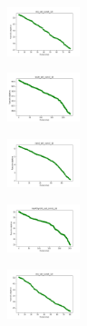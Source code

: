 \begin{figure}[H]
    \centering
    \begin{subfigure}
        \centering
        \includegraphics[width=0.234\textwidth]{img/bl/iris_set_const_10_949004259_cost.png}
    \end{subfigure}
    \hfill
    \begin{subfigure}
        \centering
        \includegraphics[width=0.234\textwidth]{img/bl/ecoli_set_const_10_949004259_cost.png}
    \end{subfigure}
    \hfill
    \begin{subfigure}
        \centering
        \includegraphics[width=0.234\textwidth]{img/bl/rand_set_const_10_949004259_cost.png}
    \end{subfigure}
    \hfill
    \begin{subfigure}
        \centering
        \includegraphics[width=0.234\textwidth]{img/bl/newthyroid_set_const_10_949004259_cost.png}
    \end{subfigure}
    \hfill
    \begin{subfigure}
        \centering
        \includegraphics[width=0.234\textwidth]{img/bl/iris_set_const_10_589741062_cost.png}
    \end{subfigure}
    \hfill
    \begin{subfigure}

\end{subfigure}
\end{figure}
